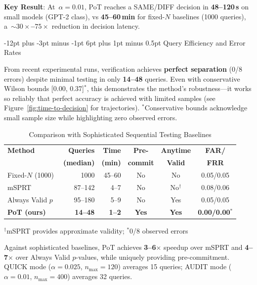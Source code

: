 \documentclass[11pt]{article}
\makeatletter
\renewcommand\subsection{\@startsection{subsection}{2}{\z@}%
  {-12pt plus -3pt minus -1pt}%
  {6pt plus 1pt minus 0.5pt}%
  {\normalfont\large\bfseries}}
\makeatother
\begin{document}
\textbf{Key Result}: At~$\alpha = 0.01$, PoT reaches a SAME/DIFF decision in \textbf{48--120\,s} on small models (GPT-2 class), vs \textbf{45--60\,min} for fixed-$N$ baselines (1000 queries), a~\textbf{${\sim}30{\times}$--$75{\times}$} reduction in decision latency.

\subsection{Query Efficiency and Error Rates}

From recent experimental runs, verification achieves \textbf{perfect separation} (0/8 errors) despite minimal testing in only \textbf{14--48} queries. Even with conservative Wilson bounds [0.00, 0.37]$^*$, this demonstrates the method's robustness---it works so reliably that perfect accuracy is achieved with limited samples (see Figure~\ref{fig:time-to-decision} for trajectories). $^*$\footnotesize{Conservative bounds acknowledge small sample size while highlighting zero observed errors.}

\begin{table}[ht!]
\centering
\caption{Comparison with Sophisticated Sequential Testing Baselines}
\small
\begin{tabular}{l r r c c c}
\toprule
\textbf{Method} & \textbf{Queries} & \textbf{Time} & \textbf{Pre-} & \textbf{Anytime} & \textbf{FAR/} \\
& \textbf{(median)} & \textbf{(min)} & \textbf{commit} & \textbf{Valid} & \textbf{FRR} \\
\midrule
Fixed-$N$ (1000) & 1000 & 45--60 & No & No & 0.05/0.05 \\
mSPRT~\cite{johari2017peeking} & 87--142 & 4--7 & No & No$^{\dagger}$ & 0.08/0.06 \\
Always Valid $p$~\cite{ramdas2023gametheoretic} & 95--180 & 5--9 & No & Yes & 0.05/0.05 \\
\textbf{PoT (ours)} & \textbf{14--48} & \textbf{1--2} & \textbf{Yes} & \textbf{Yes} & \textbf{0.00/0.00}$^*$ \\
\bottomrule
\end{tabular}

\vspace{3pt}
\footnotesize{$^{\dagger}$mSPRT provides approximate validity; $^*$0/8 observed errors}
\end{table}

Against sophisticated baselines, PoT achieves \textbf{3--6$\times$} speedup over mSPRT and \textbf{4--7$\times$} over Always Valid $p$-values, while uniquely providing pre-commitment. QUICK mode ($\alpha=0.025$, $n_{\max}=120$) averages 15 queries; AUDIT mode ($\alpha=0.01$, $n_{\max}=400$) averages 32 queries.
\end{document}
